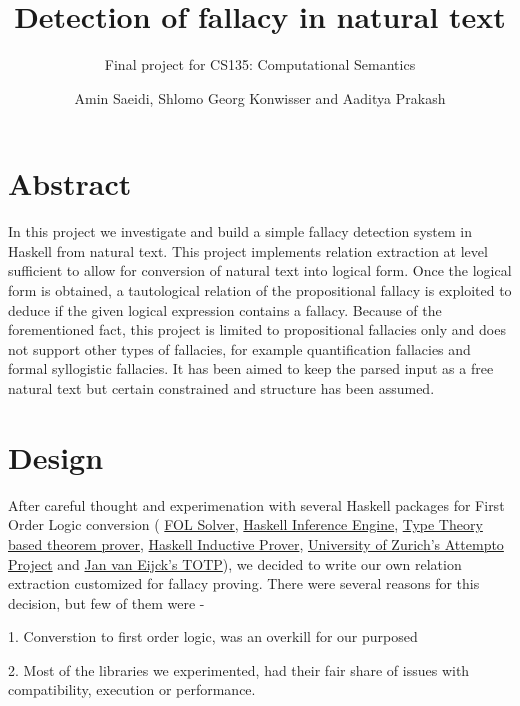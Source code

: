 \documentclass[english]{article}
\date{Amin Saeidi, Shlomo Georg Konwisser and Aaditya Prakash}
\begin{document}
\title{Detection of fallacy in natural text}

\author{Final project for CS135: Computational Semantics}

\maketitle

\section{Abstract}

In this project we investigate and build a simple fallacy detection
system in Haskell from natural text. This project implements relation
extraction at level sufficient to allow for conversion of natural
text into logical form. Once the logical form is obtained, a tautological
relation of the propositional fallacy is exploited to deduce if the
given logical expression contains a fallacy. Because of the forementioned
fact, this project is limited to propositional fallacies only and
does not support other types of fallacies, for example quantification
fallacies and formal syllogistic fallacies. It has been aimed to keep
the parsed input as a free natural text but certain constrained and
structure has been assumed.


\section{Design}

After careful thought and experimenation with several Haskell packages
for First Order Logic conversion ( \href{https://github.com/traeger/fol-solver}{FOL Solver},
\href{https://github.com/marcosccm/enki}{Haskell Inference Engine},
\href{https://github.com/edwinb/Ivor}{Type Theory based theorem prover},
\href{https://github.com/danr/hip}{Haskell Inductive Prover}, \href{http://attempto.ifi.uzh.ch/site/}{University of Zurich's Attempto Project}
and \href{http://homepages.cwi.nl/~jve/courses/12/haskellroad/TOTP.pdf}{Jan van Eijck's TOTP}),
we decided to write our own relation extraction customized for fallacy
proving. There were several reasons for this decision, but few of
them were -

1. Converstion to first order logic, was an overkill for our purposed

2. Most of the libraries we experimented, had their fair share of
issues with compatibility, execution or performance.
\end{document}
